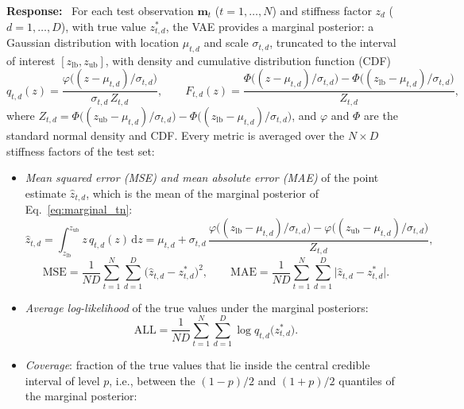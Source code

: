 \documentclass[11pt]{article}
\newenvironment{response}{\par\smallskip\noindent\color{resp}\textbf{Response:}\ }{\par}
\newcommand{\m}{\mathbf{m}}
\begin{document}
\begin{response}
	For each test observation $\m_t$ ($t=1,\dots,N$) and stiffness factor $z_d$ ($d=1,\dots,D$), with true value
	$z^*_{t,d}$, the VAE provides a marginal posterior: a Gaussian distribution with location $\mu_{t,d}$ and scale
	$\sigma_{t,d}$, truncated to the interval of interest $[z_{\text{lb}},z_{\text{ub}}]$, with density and cumulative distribution function (CDF)
	\begin{equation}
		q_{t,d}(z)=\frac{\varphi\big((z-\mu_{t,d})/\sigma_{t,d}\big)}{\sigma_{t,d}\,Z_{t,d}},\qquad
		F_{t,d}(z)=\frac{\Phi\big((z-\mu_{t,d})/\sigma_{t,d}\big)-\Phi\big((z_{\text{lb}}-\mu_{t,d})/\sigma_{t,d}\big)}{Z_{t,d}},
		\label{eq:marginal_tn}
	\end{equation}
	where $Z_{t,d}=\Phi\big((z_{\text{ub}}-\mu_{t,d})/\sigma_{t,d}\big)-\Phi\big((z_{\text{lb}}-\mu_{t,d})/\sigma_{t,d}\big)$, and $\varphi$ and
	$\Phi$ are the standard normal density and CDF. Every metric is averaged over the $N\times D$ stiffness factors of the
	test set:
	\begin{itemize}[leftmargin=*]
		\item \emph{Mean squared error (MSE) and mean absolute error (MAE)} of the point estimate $\hat z_{t,d}$, which is the
		mean of the marginal posterior of Eq.~\eqref{eq:marginal_tn}:
		\begin{equation*}
			\hat z_{t,d}=\int_{z_{\text{lb}}}^{z_{\text{ub}}} z\,q_{t,d}(z)\,\mathrm{d}z
			=\mu_{t,d}+\sigma_{t,d}\,\frac{\varphi\big((z_{\text{lb}}-\mu_{t,d})/\sigma_{t,d}\big)-\varphi\big((z_{\text{ub}}-\mu_{t,d})/\sigma_{t,d}\big)}{Z_{t,d}},
		\end{equation*}
		\begin{equation}
			\mathrm{MSE}=\frac{1}{ND}\sum_{t=1}^{N}\sum_{d=1}^{D}\big(\hat z_{t,d}-z^*_{t,d}\big)^2,\qquad
			\mathrm{MAE}=\frac{1}{ND}\sum_{t=1}^{N}\sum_{d=1}^{D}\big|\hat z_{t,d}-z^*_{t,d}\big|.
			\label{eq:mse_mae}
		\end{equation}
		\item \emph{Average log-likelihood} of the true values under the marginal posteriors:
		\begin{equation}
			\mathrm{ALL}=\frac{1}{ND}\sum_{t=1}^{N}\sum_{d=1}^{D}\log q_{t,d}\big(z^*_{t,d}\big).
			\label{eq:all}
		\end{equation}
		\item \emph{Coverage}: fraction of the true values that lie inside the central credible interval of level $p$, i.e.,
		between the $(1-p)/2$ and $(1+p)/2$ quantiles of the marginal posterior:
		\begin{equation}

\end{equation}
\end{itemize}
\end{response}
\end{document}

